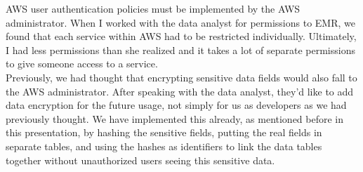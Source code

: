 \noindent AWS user authentication policies must be implemented by the AWS administrator. When I worked with the data analyst for permissions to EMR, we found that each service within AWS had to be restricted individually. Ultimately, I had less permissions than she realized and it takes a lot of separate permissions to give someone access to a service.\\

\noindent Previously, we had thought that encrypting sensitive data fields would also fall to the AWS administrator. After speaking with the data analyst, they’d like to add data encryption for the future usage, not simply for us as developers as we had previously thought. We have implemented this already, as mentioned before in this presentation, by hashing the sensitive fields, putting the real fields in separate tables, and using the hashes as identifiers to link the data tables together without unauthorized users seeing this sensitive data.

